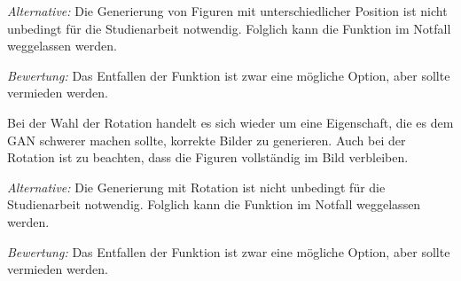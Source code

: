 \begin{description}[style=nextline]
	\textit{Alternative:}
	Die Generierung von Figuren mit unterschiedlicher Position ist nicht unbedingt für die Studienarbeit notwendig.
	Folglich kann die Funktion im Notfall weggelassen werden.
	
	\textit{Bewertung:}
	Das Entfallen der Funktion ist zwar eine mögliche Option, aber sollte vermieden werden.
	
	\item[Generierung von Figuren mit unterschiedlicher Rotation]
	Bei der Wahl der Rotation handelt es sich wieder um eine Eigenschaft, die es dem GAN schwerer machen sollte, korrekte Bilder zu generieren.
	Auch bei der Rotation ist zu beachten, dass die Figuren vollständig im Bild verbleiben.
	
	\textit{Alternative:}
	Die Generierung mit Rotation ist nicht unbedingt für die Studienarbeit notwendig.
	Folglich kann die Funktion im Notfall weggelassen werden.
	
	\textit{Bewertung:}
	Das Entfallen der Funktion ist zwar eine mögliche Option, aber sollte vermieden werden.
\end{description}
